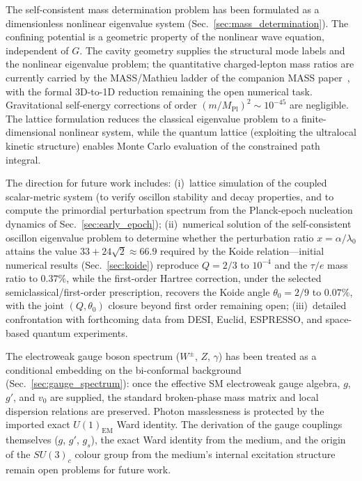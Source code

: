 \documentclass[aps,prd,onecolumn,superscriptaddress,nofootinbib,showpacs,12pt,notitlepage]{revtex4-2}
\newcommand{\Mpl}{M_{\mathrm{Pl}}}
\begin{document}
The self-consistent mass determination problem has been
formulated as a dimensionless nonlinear eigenvalue system
(Sec.~\ref{sec:mass_determination}).  The confining potential
is a geometric property of the nonlinear wave equation,
independent of $G$.  The cavity geometry supplies the
structural mode labels and the nonlinear eigenvalue problem;
the quantitative charged-lepton mass ratios are currently
carried by the MASS/Mathieu ladder of the companion MASS
paper~\cite{Lotishvili2026Mass}, with the formal 3D-to-1D
reduction remaining the open numerical task.  Gravitational
self-energy corrections of order $(m/\Mpl)^2 \sim 10^{-45}$
are negligible.  The lattice
formulation reduces the classical eigenvalue problem to a
finite-dimensional nonlinear system, while the quantum
lattice (exploiting the ultralocal kinetic structure) enables
Monte Carlo evaluation of the constrained path integral.

The direction for future work includes: (i)~lattice simulation of
the coupled scalar-metric system (to verify oscillon
stability and decay properties, and to compute the primordial
perturbation spectrum from the Planck-epoch nucleation dynamics of
Sec.~\ref{sec:early_epoch}); (ii)~numerical solution of the
self-consistent oscillon eigenvalue problem to determine
whether the perturbation ratio $x = \alpha/\lambda_0$ attains
the value $33 + 24\sqrt{2} \approx 66.9$ required by the Koide
relation---initial numerical results (Sec.~\ref{sec:koide})
reproduce $Q = 2/3$ to $10^{-4}$ and the
$\tau/e$ mass ratio to $0.37\%$, while the first-order
Hartree correction, under the selected
semiclassical/first-order prescription, recovers the Koide
angle $\theta_0 = 2/9$ to $0.07\%$, with the joint
$(Q,\theta_0)$ closure beyond first order remaining open;
(iii)~detailed confrontation with
forthcoming data from DESI, Euclid, ESPRESSO, and
space-based quantum experiments.

The electroweak gauge boson spectrum ($W^{\pm}$, $Z$,
$\gamma$) has been treated as a conditional embedding on the
bi-conformal background (Sec.~\ref{sec:gauge_spectrum}):
once the effective SM electroweak gauge algebra, $g$, $g'$,
and $v_0$ are supplied, the standard broken-phase mass matrix
and local dispersion relations are preserved.  Photon
masslessness is protected by the imported exact
$U(1)_{\mathrm{EM}}$ Ward identity.  The derivation of the
gauge couplings themselves ($g$, $g'$, $g_s$), the exact
Ward identity from the medium, and the origin of the
$SU(3)_c$ colour group from the medium's internal excitation
structure remain open problems for future work.
\end{document}
